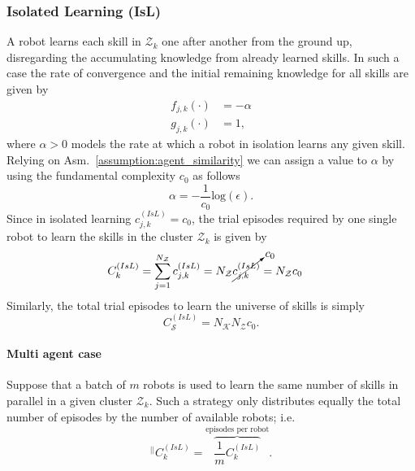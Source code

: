 \subsubsection{\textbf{Isolated Learning (IsL)}} A robot learns each skill in $\mathcal{Z}_k$ one after another from the ground up, disregarding the accumulating knowledge from already learned skills. In such a case the rate of convergence and the initial remaining knowledge for all skills are given by
\begin{subequations}\label{eq:fg_isolated}
	\begin{alignat}{2}
		f_{j,k}\left(\cdot \right) &=  -\alpha \\
		g_{j,k}\left(\cdot \right) &= 1,
	\end{alignat}
\end{subequations}
where $ \alpha>0$ models the rate at which a robot in isolation learns any given skill. Relying on Asm.~\ref{assumption:agent_similarity} we can assign a value to $\alpha$ by using the fundamental complexity $c_0$ as follows
\begin{equation}\label{eq:isolated_learning_rate}
	\alpha = -\frac{1}{c_0}\text{log}(\epsilon).
\end{equation}
Since in isolated learning $c^{(IsL)}_{j,k} = c_0$, the trial episodes required by one single robot to learn the skills in the cluster $\mathcal{Z}_k$ is given by
\begin{align}
	\begin{split}
		C^{(IsL)}_{k} &= \sum_{j=1}^{N_{\mathcal{Z}}} c^{(IsL)}_{j,k}= N_{\mathcal{Z}}  \cancelto{c_{0}}{c^{(IsL)}_{j,k}} = N_{\mathcal{Z}} c_0
	\end{split}
\end{align}
Similarly, the total trial episodes to learn the universe of skills is simply
\begin{equation}
	C^{(IsL)}_{\mathcal{S}} = N_\mathcal{K} N_{\mathcal{Z}} c_0.
\end{equation}
\paragraph*{Multi agent case}
Suppose that a batch of $m$ robots is used to learn the same number of skills in parallel in a given cluster $\mathcal{Z}_k$. Such a strategy only distributes equally the total number of episodes by the number of available robots; i.e.
\begin{equation}
	^{\lvert \lvert}C^{(IsL)}_k=  \overbrace{\frac{1}{m}C^{(IsL)}_k}^{\text{episodes per robot}}.
\end{equation}




